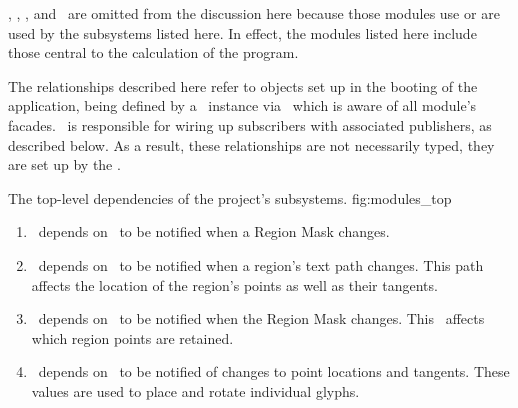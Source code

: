 \docmod, \uimod, \permod, and \bmmod\ are omitted from the discussion here because those modules use or are used by the subsystems listed here.
In effect, the modules listed here include those central to the calculation of the program.

The relationships described here refer to objects set up in the booting of the application, being defined by a \sysfact\ instance via \sysbldr\ which is aware of all module's facades.
\sysbldr\ is responsible for wiring up subscribers with associated publishers, as described below.
As a result, these relationships are not necessarily typed, they are set up by the \sysfact.

{The top-level dependencies of the project's subsystems.}
{fig:modules_top}
{\diagsize}

\begin{enumerate}
  \item \linemod\ depends on \regmod\ to be notified when a Region Mask changes.
  \item \ptmod\ depends on \linemod\ to be notified when a region's text path changes.  This path affects the location of the region's points as well as their tangents.
  \item \ptmod\ depends on \regmod\ to be notified when the Region Mask changes.  This \bmtype\ affects which region points are retained.
  \item \glymod\ depends on \ptmod\ to be notified of changes to point locations and tangents.  These values are used to place and rotate individual glyphs.
\end{enumerate}

